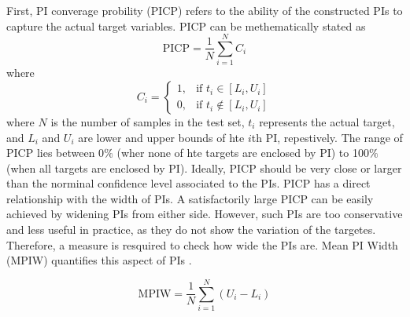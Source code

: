 \documentclass[review]{elsarticle}
\begin{document}
        First,  PI converage probility (PICP) refers to the ability of the constructed PIs to capture the actual target variables.
        PICP can be methematically stated as
        \begin{equation}
          \text{PICP} = \frac{1}{N} \sum_{i=1}^{N} C_{i}
          \label{eq.PICP}
        \end{equation}
        where
        \begin{equation}
          C_{i} =
          \begin{cases}
            1, & \text{if  $t_{i} \in [L_{i},U_{i}]$} \\
            0, & \text{if  $t_{i} \not\in [L_{i},U_{i}]$}
          \end{cases}
          \label{eq.Ci}
        \end{equation}
        where $N$ is the number of samples in the test set, $t_{i}$ represents the actual target, and $L_{i}$ and $U_{i}$ are lower and upper bounds of hte $i$th PI, repestively.
        The range of PICP lies between 0$\%$ (wher none of hte targets are enclosed by PI) to 100$\%$ (when all targets are enclosed by PI).
        Ideally, PICP should be very close or larger than the norminal confidence level associated to the PIs.
        PICP has a direct relationship with the width of PIs.
        A satisfactorily large PICP can be easily achieved by widening PIs from either side.
        However, such PIs are too conservative and less useful in practice, as they do not show the variation of the targetes.
        Therefore, a measure is resquired to check how wide the PIs are.
        Mean PI Width (MPIW) quantifies this aspect of PIs \cite{Khosravi2010}.

        \begin{equation}
          \text{MPIW} = \frac{1}{N} \sum_{i=1}^{N} (U_{i}-L_{i})
          \label{eq.MPIW}
        \end{equation}
\end{document}
